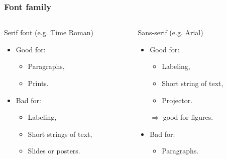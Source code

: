\documentclass[hyperref={pdfpagelayout=SinglePage}]{beamer}
\def\tcb{\color{blue}}
\begin{document}
\begin{frame}[fragile]
\frametitle{Font family}
\begin{columns}
    
    \begin{column}{0.5\textwidth}
    \begin{center}
        \textrm{Serif font (e.g. Time Roman)}  
    \end{center}
    \begin{itemize}
        \item Good for: 
            \begin{itemize}
                \item Paragraphs,
                \item Prints.
            \end{itemize}
        \item Bad for:
            \begin{itemize}
                \item Labeling,
                \item Short strings of text,
                \item Slides or posters.
            \end{itemize}
    \end{itemize}
    \end{column}

    \begin{column}{0.5\textwidth}
    \begin{center}
        Sans-serif (e.g. Arial)\\
    \end{center}
    \begin{itemize}
        \item Good for:
            \begin{itemize}
                \item Labeling,
                \item Short string of text,
                \item Projector.
            \end{itemize}
            {\tcb$\Rightarrow$ good for figures.}
        \item Bad for: 
            \begin{itemize}
                \item Paragraphs.
            \end{itemize}
    \end{itemize}
    \end{column}
\end{columns}
\begin{center}
{\large{}}
    
\end{center}
\end{frame}
\end{document}
